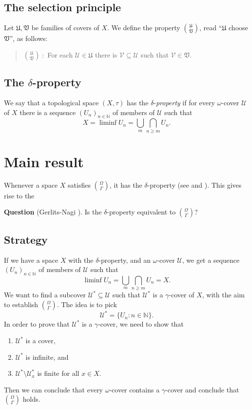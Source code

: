 \documentclass[12pt]{amsart}
\gdef\cal{\mathcal}
\gdef\frak{\mathfrak}
\begin{document}
\subsection{The selection principle} Let ${\mathfrak U}, {\mathfrak V}$ be
families of covers of $X$. We define the property ${{\frak U}\choose
{\frak V}}$, read ``$\frak U$ choose $\frak V$'', as follows:

\begin{quote}
  ${{\frak U}\choose {\frak V}}\; :$ For each ${\cal U}\in {\frak U}$
  there is ${\cal V}\subseteq {\cal U}$ such that ${\cal V}\in {\frak V}$.
\end{quote}

\subsection{The $\delta$-property} We say that a topological
space $(X,\tau)$ has the $\delta$-{\em property} if 
for every $\omega$-cover ${\cal U}$ of $X$ there is a sequence
$(U_n)_{n\in\mathbb{N}}$ of members of ${\cal U}$ such that 
$$X = \liminf U_n = \bigcup_m\bigcap_{n\geq m} U_n.$$

\section{Main result}
Whenever a space $X$ satisfies ${\Omega\choose \Gamma}$, it has
the $\delta$-property (see \cite{gamma} and \cite{spm}).
This gives rise to the 

{\bf Question} (Gerlits-Nagi \cite{gamma}). Is the $\delta$-property
equivalent to ${\Omega\choose\Gamma}$?

\subsection{Strategy} If we have a space $X$ with the $\delta$-property,
and an $\omega$-cover ${\cal U}$, we get a sequence 
$(U_n)_{n\in\mathbb{N}}$ of members of ${\cal U}$ 
such that $$\liminf U_n = \bigcup_m\bigcap_{n\geq m}U_n = X.$$ 
We want to find
a subcover ${\cal U}^*\subseteq {\cal U}$ such that 
${\cal U}^*$ is a $\gamma$-cover of $X$, with the aim
to establish ${\Omega\choose \Gamma}$. The idea is to pick 
$${\cal U}^* = \{U_n:n\in\mathbb{N}\}.$$
In order to prove that ${\cal U}^*$ is a $\gamma$-cover, we need to show
that 
\begin{enumerate}
\item ${\cal U}^*$ is a cover, 
\item ${\cal U}^*$ is infinite, and
\item ${\cal U}^*\setminus {\cal U}^*_x$ is finite for all $x\in X$.
\end{enumerate}
Then we can conclude that every $\omega$-cover contains a $\gamma$-cover
and conclude that ${\Omega\choose\Gamma}$ holds.
\end{document}
